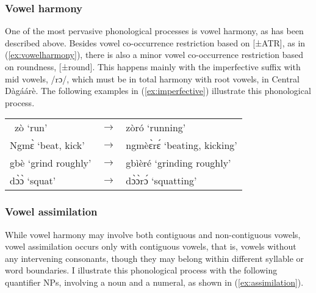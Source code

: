 \subsubsection{Vowel harmony}
One of the most pervasive phonological processes is vowel harmony, as has been
described above. Besides vowel co-occurrence restriction based on [±ATR], as in (\ref{ex:vowelharmony}), there is
also a minor vowel co-occurrence restriction based on roundness, [±round]. This happens
mainly with the imperfective suffix with mid vowels, /rɔ/, which must be in total harmony
with root vowels, in Central Dàgáárè. The following examples in (\ref{ex:imperfective}) illustrate this
phonological process.


\ea \label{ex:imperfective} \begin{tabular}{lll} \ zò ‘run’&  $\rightarrow$ & zòró ‘running’\\
Ngmɛ̀ ‘beat, kick’  & $\rightarrow$  & ngmèɛ̀rɛ́ ‘beating, kicking’\\
gbè ‘grind roughly’& $\rightarrow$ & gbìèré ‘grinding roughly’\\
dɔ̀ɔ̀ ‘squat’&  $\rightarrow$ &   dɔ̀ɔ̀rɔ́ ‘squatting’\\
\end{tabular}
\z 


\subsubsection{Vowel assimilation}
While vowel harmony may involve both contiguous and non-contiguous vowels,
vowel assimilation occurs only with contiguous vowels, that is, vowels without any intervening consonants, though they may belong within different syllable or word boundaries. I illustrate this phonological process with the following quantifier NPs, involving a noun and a numeral, as shown in (\ref{ex:assimilation}).

\ea \label{ex:assimilation} 
\z\z 







